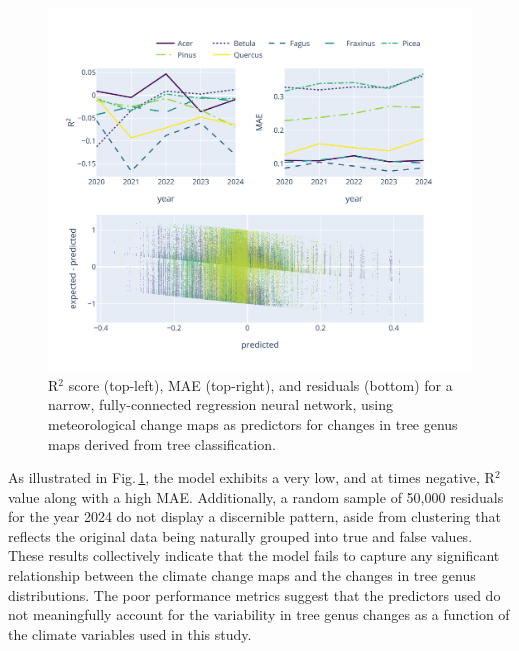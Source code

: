 \begin{figure}[ht]
    \centering
    \includegraphics[width=0.98\linewidth, trim={10pt 20pt 50pt 40pt}, clip]{figures/figures_climate/regression_results.png}
    \caption{R$^2$ score (top-left), MAE (top-right), and residuals (bottom) for a narrow, fully-connected regression neural network, using meteorological change maps as predictors for changes in tree genus maps derived from tree classification.}
    \label{fig:regression_results}
\end{figure}

As illustrated in Fig.\,\ref{fig:regression_results}, the model exhibits a very low, and at times negative, R$^2$ value along with a high MAE. Additionally, a random sample of 50,000 residuals for the year 2024 do not display a discernible pattern, aside from clustering that reflects the original data being naturally grouped into true and false values. These results collectively indicate that the model fails to capture any significant relationship between the climate change maps and the changes in tree genus distributions. The poor performance metrics suggest that the predictors used do not meaningfully account for the variability in tree genus changes as a function of the climate variables used in this study.